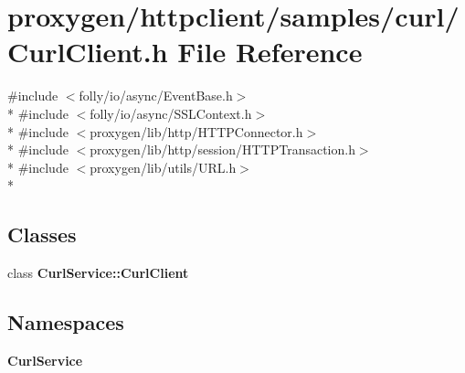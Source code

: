 \section{proxygen/httpclient/samples/curl/\+Curl\+Client.h File Reference}
\label{CurlClient_8h}
{\ttfamily \#include $<$folly/io/async/\+Event\+Base.\+h$>$}\\*
{\ttfamily \#include $<$folly/io/async/\+S\+S\+L\+Context.\+h$>$}\\*
{\ttfamily \#include $<$proxygen/lib/http/\+H\+T\+T\+P\+Connector.\+h$>$}\\*
{\ttfamily \#include $<$proxygen/lib/http/session/\+H\+T\+T\+P\+Transaction.\+h$>$}\\*
{\ttfamily \#include $<$proxygen/lib/utils/\+U\+R\+L.\+h$>$}\\*
\subsection*{Classes}
\begin{DoxyCompactItemize}
\item 
class {\bf Curl\+Service\+::\+Curl\+Client}
\end{DoxyCompactItemize}
\subsection*{Namespaces}
\begin{DoxyCompactItemize}
\item 
 {\bf Curl\+Service}
\end{DoxyCompactItemize}
